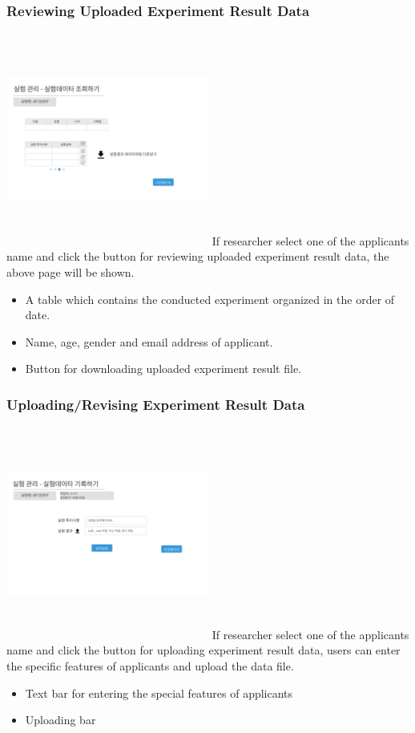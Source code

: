 \documentclass[letterpaper, 10 pt, conference]{ieeeconf}  %
\begin{document}
\subsubsection{Reviewing Uploaded Experiment Result Data}
\includegraphics[width=0.5\textwidth,height = 7cm]{Oven_ver2/ver2]09_reviewingData.jpg}
If researcher select one of the applicants name and click the button for reviewing uploaded experiment result data, the above page will be shown.
\begin{itemize}
    \item A table which contains the conducted experiment organized in the order of date.
    \item Name, age, gender and email address of applicant.
    \item Button for downloading uploaded experiment result file.
\end{itemize}




 

\subsubsection{Uploading/Revising Experiment Result Data}

\includegraphics[width=0.5\textwidth,height = 7cm]{Oven_ver2/ver2]08_recordingData.jpg}
If researcher select one of the applicants name and click the button for uploading experiment result data, users can enter the specific features of applicants and upload the data file. 
\begin{itemize}
    \item Text bar for entering the special features of applicants
    \item Uploading bar
\end{itemize}
\end{document}

